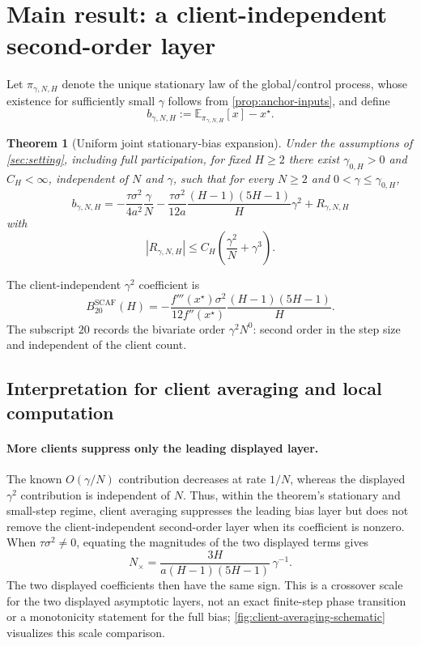\documentclass[11pt]{article}
\newtheorem{theorem}{Theorem}[section]
\theoremstyle{definition}
\newcommand{\E}{\mathbb{E}}
\newcommand{\bstat}{b_{\gamma,N,H}}
\begin{document}
\section{Main result: a client-independent second-order layer}
\label{sec:main-result}

Let $\pi_{\gamma, N, H}$ denote the unique stationary law of the global/control process, whose existence for sufficiently small $\gamma$ follows from \cref{prop:anchor-inputs}, and define
\[
\bstat:=\E_{\pi_{\gamma,N,H}}[x]-x^\star.
\]

\begin{theorem}[Uniform joint stationary-bias expansion]
\label{thm:main}
Under the assumptions of \cref{sec:setting}, including full participation, for fixed $H\ge2$ there exist $\gamma_{0,H}>0$ and $C_H<\infty$, independent of $N$ and $\gamma$, such that for every $N\ge2$ and $0<\gamma\le\gamma_{0,H}$,
\begin{equation}
\label{eq:main-expansion}
\boxed{
\bstat
=-\frac{\tau\sigma^2}{4a^2}\frac{\gamma}{N}
-\frac{\tau\sigma^2}{12a}\frac{(H-1)(5H-1)}{H}\gamma^2
+R_{\gamma, N , H}
}
\end{equation}
with
\begin{equation}
\label{eq:main-remainder}
\boxed{
|R_{\gamma,N,H}|\le C_H\left(\frac{\gamma^2}{N}+\gamma^3\right).
}
\end{equation}
\end{theorem}

The client-independent $\gamma^2$ coefficient is
\begin{equation}
\label{eq:B20-main}
\boxed{
B_{20}^{\mathrm{SCAF}}(H)
=-\frac{f'''(x^\star)\sigma^2}{12f''(x^\star)}
\frac{(H-1)(5H-1)}{H}.
}
\end{equation}
The subscript $20$ records the bivariate order $\gamma^2N^0$: second order in the step size and independent of the client count.

\subsection{Interpretation for client averaging and local computation}
\label{sec:main-interpretation}

\paragraph{More clients suppress only the leading displayed layer.}
The known $O(\gamma/N)$ contribution decreases at rate $1/N$, whereas the displayed $\gamma^2$ contribution is independent of $N$. Thus, within the theorem's stationary and small-step regime, client averaging suppresses the leading bias layer but does not remove the client-independent second-order layer when its coefficient is nonzero. When $\tau\sigma^2\neq0$, equating the magnitudes of the two displayed terms gives
\[
N_\times
=\frac{3H}{a(H-1)(5H-1)}\,\gamma^{-1}.
\]
The two displayed coefficients then have the same sign. This is a crossover scale for the two displayed asymptotic layers, not an exact finite-step phase transition or a monotonicity statement for the full bias; \cref{fig:client-averaging-schematic} visualizes this scale comparison.
\end{document}
